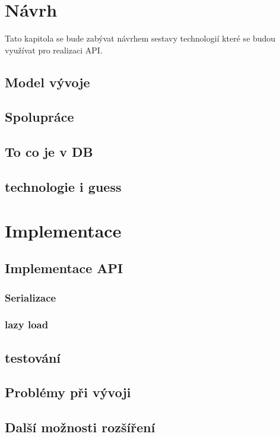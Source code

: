 \chapter{Návrh}
Tato kapitola se bude zabývat návrhem sestavy technologií které se budou využívat pro realizaci API.

\section{Model vývoje}

\section{Spolupráce}

\section{To co je v DB}

\section{technologie i guess}


\chapter{Implementace}

\section{Implementace API}

\subsection{Serializace}
\subsection{lazy load}
\section{testování}

\section{Problémy při vývoji}

\section{Další možnosti rozšíření}